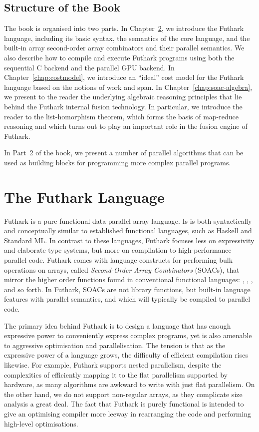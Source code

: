 \documentclass[oneside,11pt]{book}
\begin{document}
\section{Structure of the Book}

The book is organised into two parts. In Chapter~\ref{chap:futlang}, we
introduce the Futhark language, including its basic syntax, the
semantics of the core language, and the built-in array second-order
array combinators and their parallel semantics. We also describe how
to compile and execute Futhark programs using both the sequential C
backend and the parallel GPU backend. In Chapter~\ref{chap:costmodel}, we introduce
an ``ideal'' cost model for the Futhark language based on the notions
of work and span. In Chapter~\ref{chap:soac-algebra}, we present to
the reader the underlying algebraic reasoning principles that lie
behind the Futhark internal fusion technology. In particular, we
introduce the reader to the list-homorphism theorem, which forms the
basis of map-reduce reasoning and which turns out to play an important
role in the fusion engine of Futhark.

In Part~2 of the book, we present a number of parallel algorithms that
can be used as building blocks for programming more complex parallel
programs.

\chapter{The Futhark Language}
\label{chap:futlang}
Futhark is a pure functional data-parallel array language.  Is is both
syntactically and conceptually similar to established functional
languages, such as Haskell and Standard ML.  In contrast to these
languages, Futhark focuses less on expressivity and elaborate type
systems, but more on compilation to high-performance parallel code.
Futhark comes with language constructs for performing bulk operations
on arrays, called \textit{Second-Order Array Combinators} (SOACs),
that mirror the higher order functions found in conventional
functional languages: , , ,
and so forth.  In Futhark, SOACs are not library functions, but
built-in language features with parallel semantics, and which will
typically be compiled to parallel code.

The primary idea behind Futhark is to design a language that has
enough expressive power to conveniently express complex programs, yet
is also amenable to aggressive optimisation and parallelisation.  The
tension is that as the expressive power of a language grows, the
difficulty of efficient compilation rises likewise.  For example,
Futhark supports nested parallelism, despite the complexities of
efficiently mapping it to the flat parallelism supported by hardware,
as many algorithms are awkward to write with just flat parallelism.
On the other hand, we do not support non-regular arrays, as they
complicate size analysis a great deal.  The fact that Futhark is
purely functional is intended to give an optimising compiler more
leeway in rearranging the code and performing high-level
optimisations.
\end{document}
